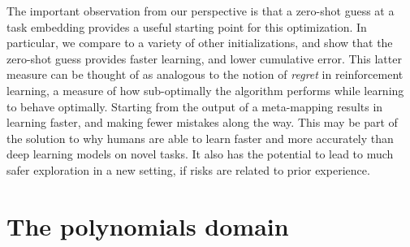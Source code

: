 The important observation from our perspective is that a zero-shot guess at a task embedding provides a useful starting point for this optimization. In particular, we compare to a variety of other initializations, and show that the zero-shot guess provides faster learning, and lower cumulative error. This latter measure can be thought of as analogous to the notion of \emph{regret} in reinforcement learning, a measure of how sub-optimally the algorithm performs while learning to behave optimally. Starting from the output of a meta-mapping results in learning faster, and making fewer mistakes along the way. This may be part of the solution to why humans are able to learn faster and more accurately than deep learning models on novel tasks. It also has the potential to lead to much safer exploration in a new setting, if risks are related to prior experience. \par   

\section{The polynomials domain}

